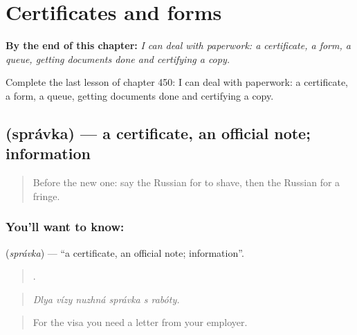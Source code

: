
\chapter{Certificates and forms}
\label{ch:ru-certificates-and-forms}

\begin{chapteropening}
\textbf{By the end of this chapter:} \emph{I can deal with paperwork: a certificate, a form, a queue, getting documents done and certifying a copy.}

Complete the last lesson of chapter 450: I can deal with paperwork: a certificate, a form, a queue, getting documents done and certifying a copy.
\end{chapteropening}

\section[\texorpdfstring{\ru{справка} (správka)}{справка (správka)}]{ (správka) — a certificate, an official note; information}

\label{lesson:RU-C450-spravka}



\begin{quote}
Before the new one: say the Russian for to shave, then the Russian for a fringe.
\end{quote}

\subsection*{You'll want to know: }
\textbf{} (\emph{správka}) — \textquotedblleft{}a certificate, an official note; information\textquotedblright{}.

\begin{quote}
     .
\end{quote}

\begin{quote}
\emph{Dlya vízy nuzhná správka s rabóty.}
\end{quote}

\begin{quote}
For the visa you need a letter from your employer.
\end{quote}

